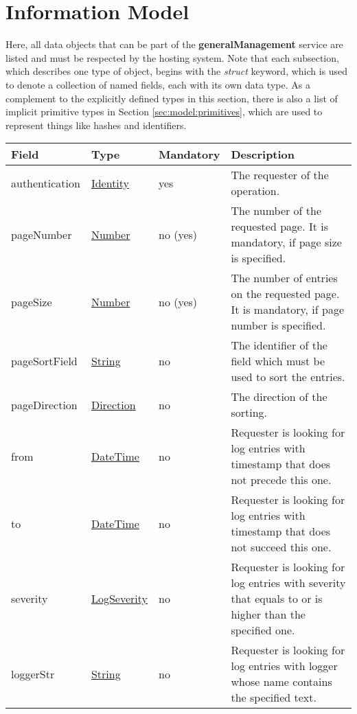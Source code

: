\documentclass[a4paper]{arrowhead}
\newcommand{\pref}[1]{{\textcolor{ArrowheadGrey}{\hyperref[sec:model:primitives:#1]{#1}}}}
\begin{document}
\clearpage

\section{Information Model}
\label{sec:model}

Here, all data objects that can be part of the \textbf{generalManagement} service
are listed and must be respected by the hosting system.
Note that each subsection, which describes one type of object, begins with the \textit{struct} keyword, which is used to denote a collection of named fields, each with its own data type.
As a complement to the explicitly defined types in this section, there is also a list of implicit primitive types in Section \ref{sec:model:primitives}, which are used to represent things like hashes and identifiers.

{}
 
\begin{table}[ht!]
\begin{tabularx}{\textwidth}{| p{2.5cm} | p{2.5cm} | p{2cm} | X |} \hline
\rowcolor{gray!33} Field & Type & Mandatory & Description \\ \hline
authentication & \hyperref[sec:model:Identity]{Identity} & yes & The requester of the operation. \\ \hline
pageNumber & \pref{Number} & no (yes) & The number of the requested page. It is mandatory, if page size is specified. \\ \hline
pageSize & \pref{Number} & no (yes) & The number of entries on the requested page. It is mandatory, if page number is specified. \\ \hline
pageSortField & \pref{String} & no & The identifier of the field which must be used to sort the entries. \\ \hline
pageDirection & \pref{Direction} & no & The direction of the sorting. \\ \hline
from & \pref{DateTime} & no & Requester is looking for log entries with timestamp that does not precede this one. \\ \hline
to & \pref{DateTime} & no & Requester is looking for log entries with timestamp that does not succeed this one. \\ \hline
severity & \pref{LogSeverity} & no & Requester is looking for log entries with severity that equals to or is higher than the specified one. \\ \hline
loggerStr &  \pref{String} & no & Requester is looking for log entries with logger whose name contains the specified text. \\ \hline
\end{tabularx}
\end{table}
\end{document}
